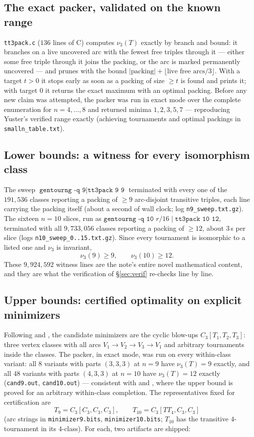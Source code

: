 \documentclass[11pt]{amsart}
\newcommand{\nut}{\nu_3}
\theoremstyle{plain}
\theoremstyle{definition}
\theoremstyle{remark}
\begin{document}
\subsection{The exact packer, validated on the known
range}\label{ssec:packer}
\texttt{tt3pack.c} ($136$ lines of C) computes $\nut(T)$ exactly by
branch and bound: it branches on a live uncovered arc with the fewest
free triples through it --- either some free triple through it joins the
packing, or the arc is marked permanently uncovered --- and prunes with
the bound $|\text{packing}| + \lfloor\text{live free arcs}/3\rfloor$.
With a target $t>0$ it stops early as soon as a packing of size $\ge t$
is found and prints it; with target $0$ it returns the exact maximum with
an optimal packing. Before any new claim was attempted, the packer was
run in exact mode over the complete enumeration for $n=4,\dots,8$ and
returned minima $1,2,3,5,7$ --- reproducing Yuster's verified
range \cite{Yuster04} exactly (achieving tournaments and optimal packings
in \texttt{smalln\_table.txt}).

\subsection{Lower bounds: a witness for every isomorphism
class}\label{ssec:lower}
The sweep $\texttt{gentourng -q 9}\mid\texttt{tt3pack 9 9}$ terminated
with every one of the $191{,}536$ classes reporting a packing of $\ge9$
arc-disjoint transitive triples, each line carrying the packing itself
(about a second of wall clock; log \texttt{n9\_sweep.txt.gz}). The sixteen
$n=10$ slices, run as
$\texttt{gentourng -q 10 } r/16\mid\texttt{tt3pack 10 12}$, terminated
with all $9{,}733{,}056$ classes reporting a packing of $\ge12$, about
$3$\,s per slice (logs \texttt{n10\_sweep\_0..15.txt.gz}). Since every
tournament is isomorphic to a listed one and $\nut$ is invariant,
\[
\nut(9)\ge 9, \qquad \nut(10)\ge 12 .
\]
These $9{,}924{,}592$ witness lines are the note's entire novel
mathematical content, and they are what the verification of
\S\ref{sec:verif} re-checks line by line.

\subsection{Upper bounds: certified optimality on explicit
minimizers}\label{ssec:upper}
Following \cite[\S4]{Yuster04} and \cite[\S2.4]{KY08}, the candidate
minimizers are the cyclic blow-ups $C_3[T_1,T_2,T_3]$: three vertex classes with all arcs
$V_1\to V_2\to V_3\to V_1$ and arbitrary tournaments inside the classes.
The packer, in exact mode, was run on every within-class variant: all
$8$ variants with parts $(3,3,3)$ at $n=9$ have $\nut(T)=9$ exactly, and
all $48$ variants with parts $(4,3,3)$ at $n=10$ have $\nut(T)=12$
exactly (\texttt{cand9.out}, \texttt{cand10.out}) --- consistent with
\cite[\S4]{Yuster04} and \cite[\S2.4]{KY08}, where the upper bound is
proved for an arbitrary within-class completion. The representatives fixed for certification are
\[
T_9=C_3[C_3,C_3,C_3], \qquad T_{10}=C_3[TT_4,C_3,C_3]
\]
(arc strings in \texttt{minimizer9.bits}, \texttt{minimizer10.bits};
$T_{10}$ has the transitive $4$-tournament in its $4$-class). For each,
two artifacts are shipped:
\end{document}
